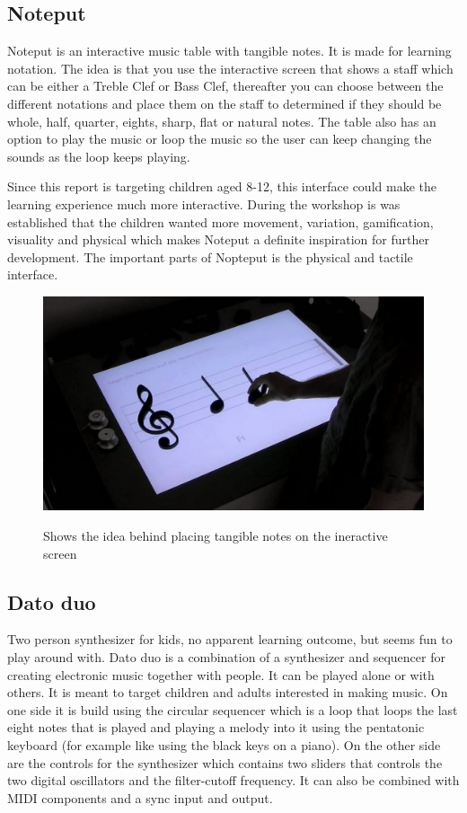 \subsection{Noteput} 
Noteput is an interactive music table with tangible notes. It is made for learning notation. The idea is that you use the interactive screen that shows a staff which can be either a Treble Clef or Bass Clef, thereafter you can choose between the different notations and place them on the staff to determined if they should be whole, half, quarter, eights, sharp, flat or natural notes. The table also has an option to play the music or loop the music so the user can keep changing the sounds as the loop keeps playing. 

Since this report is targeting children aged 8-12, this interface could make the learning experience much more interactive. During the workshop is was established that the children wanted more movement, variation, gamification, visuality and physical which makes Noteput a definite inspiration for further development. The important parts of Nopteput is the physical and tactile interface. \cite{Noteput} 
\begin{figure}[H]
	\centering
	\includegraphics[width=0.7\linewidth]{figure/Analysis/noteput}
	\label{fig:noteput}
	\caption{Shows the idea behind placing tangible notes on the ineractive screen \cite{Noteput}}
\end{figure}


\subsection{Dato duo} 
Two person synthesizer for kids, no apparent learning outcome, but seems fun to play around with. Dato duo is a combination of a synthesizer and sequencer for creating electronic music together with people. It can be played alone or with others. It is meant to target children and adults interested in making music. On one side it is build using the circular sequencer which is a loop that loops the last eight notes that is played and playing a melody into it using the pentatonic keyboard (for example like using the black keys on a piano). On the other side are the controls for the synthesizer which contains two sliders that controls the two digital oscillators and the filter-cutoff frequency. It can also be combined with MIDI components and a sync input and output. 

